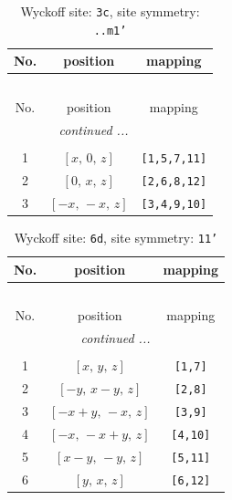 \documentclass[fleqn,8pt]{jsarticle}
\begin{document}
\begin{longtable}{ccc}
\caption{Wyckoff site: {\tt 3c}, site symmetry: {\tt ..m1'}}
 \\
 \hline \hline
No. & position & mapping \\ \hline \endfirsthead

\multicolumn{2}{l}{\tablename\ \thetable{}} \\
 \hline \hline
No. & position & mapping \\ \hline \endhead

 \hline \hline
\multicolumn{2}{r}{\footnotesize\it continued ...} \\ \endfoot

 \hline \hline
\multicolumn{2}{r}{} \\ \endlastfoot

1 & $\left[ x,\, 0,\, z \right]$ & {\tt [1,5,7,11]} \\ \hline
2 & $\left[ 0,\, x,\, z \right]$ & {\tt [2,6,8,12]} \\ \hline
3 & $\left[ - x,\, - x,\, z \right]$ & {\tt [3,4,9,10]} \\
\end{longtable}
\renewcommand{\arraystretch}{1.2}
\begin{longtable}{ccc}
\caption{Wyckoff site: {\tt 6d}, site symmetry: {\tt 11'}}
 \\
 \hline \hline
No. & position & mapping \\ \hline \endfirsthead

\multicolumn{2}{l}{\tablename\ \thetable{}} \\
 \hline \hline
No. & position & mapping \\ \hline \endhead

 \hline \hline
\multicolumn{2}{r}{\footnotesize\it continued ...} \\ \endfoot

 \hline \hline
\multicolumn{2}{r}{} \\ \endlastfoot

1 & $\left[ x,\, y,\, z \right]$ & {\tt [1,7]} \\ \hline
2 & $\left[ - y,\, x - y,\, z \right]$ & {\tt [2,8]} \\ \hline
3 & $\left[ - x + y,\, - x,\, z \right]$ & {\tt [3,9]} \\ \hline
4 & $\left[ - x,\, - x + y,\, z \right]$ & {\tt [4,10]} \\ \hline
5 & $\left[ x - y,\, - y,\, z \right]$ & {\tt [5,11]} \\ \hline
6 & $\left[ y,\, x,\, z \right]$ & {\tt [6,12]} \\
\end{longtable}
\end{document}
